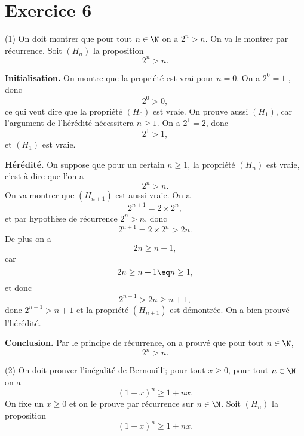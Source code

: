 \documentclass[12pt, a4paper,oneside]{article} %
\begin{document}
\section{Exercice 6}

(1)
On doit montrer que pour tout
$ n \in \N $
on a
$ 2^{n} > n $.
On va le montrer par récurrence.
Soit $ (H_n) $ la proposition
\begin{equation}
2^{n} > n 
.
\end{equation}

\textbf{Initialisation.}
On montre que la propriété
est vrai pour $ n=0 $.
On a
$2^{0} = 1$
,
donc
\begin{equation}
	2^{0} > 0
	,
\end{equation}
ce qui veut dire que la propriété
$ (H_{0}) $
est vraie.
On prouve aussi $ (H_{1}) $,
car l'argument de l'hérédité
nécessitera $ n \ge 1 $.
On a $ 2^{1} = 2 $,
donc
\begin{equation}
	2^{1} > 1
	,
\end{equation}
et $ (H_{1}) $
est vraie.

\textbf{Hérédité.}
On suppose que pour un certain
$ n \ge 1 $,
la propriété
$ (H_{n}) $ est vraie,
c'est à dire que l'on a
\begin{equation}
	2^{n} > n
	.
\end{equation}
On va montrer que
$ (H_{n+1}) $
est aussi vraie.
On a
\begin{equation}
	2^{n+1}
	=
	2 \times
	2^{n}
	,
\end{equation}
et par hypothèse
de récurrence
$ 2^{n} > n $,
donc
\begin{equation}
	2^{n+1}
	=
	2 \times
	2^{n} 
	>
	2 n
	.
\end{equation}
De plus on a
\begin{equation}
	2n \ge n+1
	,
\end{equation}
car
\begin{equation}
	2n \ge n+1
	\eq
	n \ge 1,
\end{equation}
et donc
\begin{equation}
	2^{n+1}
	> 2n
	\ge n+1
	,
\end{equation}
donc $ 2^{n+1} > n+1 $
et la propriété $ (H_{n+1}) $
est démontrée.
On a bien prouvé l'hérédité.

\textbf{Conclusion.}
Par le principe de récurrence,
on a prouvé que pour tout
$ n \in \N $,
\begin{equation}
	2^{n} 
	>
	n
	.
\end{equation}

(2) On doit prouver l'inégalité
de Bernouilli; pour tout $ x \ge 0 $,
pour tout $ n \in \N $ on a
\begin{equation}
	(1+x)^{n} 
	\ge
	1 + nx
	.
\end{equation}
On fixe un $ x \ge 0 $
et on le prouve par récurrence
sur $ n \in \N $.
Soit $ (H_{n}) $ la proposition
\begin{equation}
	(1+x)^{n} 
	\ge
	1 + nx
	.
\end{equation}
\end{document}
